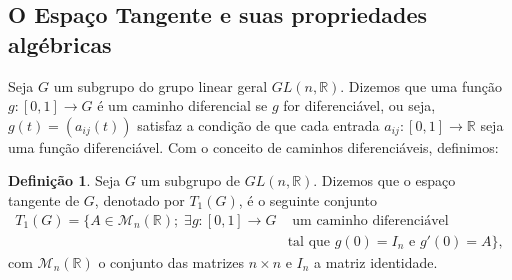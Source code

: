 \documentclass[twoside,openright,titlepage,numbers=noenddot,headinclude,  lineheaders footinclude=true,cleardoublepage=empty,
                                BCOR=5mm,paper=a4,fontsize=12pt ]{scrbook}
\theoremstyle{definition}
\newtheorem{definicao}{Definição}[chapter]
\begin{document}
\subsection{ O Espa\c{c}o Tangente e suas propriedades algébricas} \label{subsec:espTg}
Seja $G$ um subgrupo do grupo linear geral $GL(n, \mathbb{R})$. 
Dizemos que uma função \mbox{$g:[0,1] \rightarrow G$} é um caminho diferencial se
$g$ for diferenciável, ou seja, $g(t) = ( a_{ij}(t) )$ satisfaz a condição de que 
cada entrada $a_{ij}:[0,1] \rightarrow \mathbb{R}$  seja uma função diferenciável.
Com o conceito de caminhos diferenciáveis, definimos: 
\begin{definicao}
Seja $G$ um subgrupo de $GL(n, \mathbb{R})$. Dizemos que o espaço tangente de $G$,  denotado por $T_1(G)$, é o seguinte conjunto
\begin{align*}
 T_1(G) = \{ A \in \mathcal{M}_n(\mathbb{R}); 	\; \exists g:[0,1] \rightarrow G & \text{ um caminho diferenciável} \\
						   & \text{tal que } g(0) = I_n \text{ e } g'(0) = A \}, 
\end{align*}
com $\mathcal{M}_n(\mathbb{R})$ o conjunto das matrizes $n \times n$ e $I_n$ a matriz identidade.
\end{definicao} 
\end{document}
